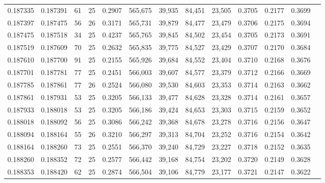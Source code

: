 \begin{tabular}{rrrrrrrrrrrrr}
0.187335 & 0.187391 &  61 &  25 &                                     0.2907 & 565,675 &  39,935 &  84,451 &  23,505 & 0.3705 & 0.2177 & 0.3699 \\
0.187397 & 0.187475 &  56 &  26 &                                     0.3171 & 565,731 &  39,879 &  84,477 &  23,479 & 0.3706 & 0.2175 & 0.3694 \\
0.187475 & 0.187518 &  34 &  25 &                                     0.4237 & 565,765 &  39,845 &  84,502 &  23,454 & 0.3705 & 0.2173 & 0.3691 \\
0.187519 & 0.187609 &  70 &  25 &                                     0.2632 & 565,835 &  39,775 &  84,527 &  23,429 & 0.3707 & 0.2170 & 0.3684 \\
0.187610 & 0.187700 &  91 &  25 &                                     0.2155 & 565,926 &  39,684 &  84,552 &  23,404 & 0.3710 & 0.2168 & 0.3676 \\
0.187701 & 0.187781 &  77 &  25 &                                     0.2451 & 566,003 &  39,607 &  84,577 &  23,379 & 0.3712 & 0.2166 & 0.3669 \\
0.187785 & 0.187861 &  77 &  26 &                                     0.2524 & 566,080 &  39,530 &  84,603 &  23,353 & 0.3714 & 0.2163 & 0.3662 \\
0.187861 & 0.187931 &  53 &  25 &                                     0.3205 & 566,133 &  39,477 &  84,628 &  23,328 & 0.3714 & 0.2161 & 0.3657 \\
0.187933 & 0.188018 &  53 &  25 &                                     0.3205 & 566,186 &  39,424 &  84,653 &  23,303 & 0.3715 & 0.2159 & 0.3652 \\
0.188018 & 0.188092 &  56 &  25 &                                     0.3086 & 566,242 &  39,368 &  84,678 &  23,278 & 0.3716 & 0.2156 & 0.3647 \\
0.188094 & 0.188164 &  55 &  26 &                                     0.3210 & 566,297 &  39,313 &  84,704 &  23,252 & 0.3716 & 0.2154 & 0.3642 \\
0.188164 & 0.188260 &  73 &  25 &                                     0.2551 & 566,370 &  39,240 &  84,729 &  23,227 & 0.3718 & 0.2152 & 0.3635 \\
0.188260 & 0.188352 &  72 &  25 &                                     0.2577 & 566,442 &  39,168 &  84,754 &  23,202 & 0.3720 & 0.2149 & 0.3628 \\
0.188353 & 0.188420 &  62 &  25 &                                     0.2874 & 566,504 &  39,106 &  84,779 &  23,177 & 0.3721 & 0.2147 & 0.3622 \\

\end{tabular}
